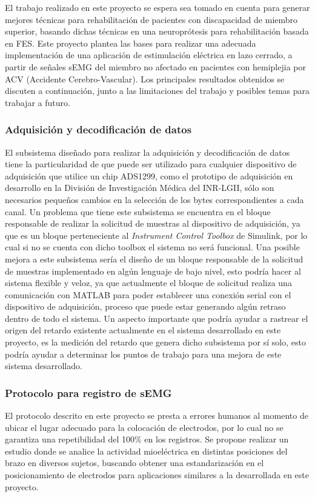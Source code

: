 El trabajo realizado en este proyecto se espera sea tomado en cuenta para generar mejores técnicas para rehabilitación de pacientes con discapacidad de miembro superior, basando dichas técnicas en una neuroprótesis para rehabilitación basada en FES. Este proyecto plantea las bases para realizar una adecuada implementación de una aplicación de estimulación eléctrica en lazo cerrado, a partir de señales sEMG del miembro no afectado en pacientes con hemiplejia por ACV (Accidente Cerebro-Vascular). Los principales resultados obtenidos se discuten a continuación, junto a las limitaciones del trabajo y posibles temas para trabajar a futuro.

\subsubsection*{Adquisición y decodificación de datos}
El subsistema diseñado para realizar la adquisición y decodificación de datos tiene la particularidad de que puede ser utilizado para cualquier dispositivo de adquisición que utilice un chip ADS1299, como el prototipo de adquisición en desarrollo en la División de Investigación Médica del INR-LGII, sólo son necesarios pequeños cambios en la selección de los bytes correspondientes a cada canal. Un problema que tiene este subsistema se encuentra en el bloque responsable de realizar la solicitud de muestras al dispositivo de adquisición, ya que es un bloque perteneciente al \emph{Instrument Control Toolbox} de Simulink\textregistered, por lo cual si no se cuenta con dicho toolbox el sistema no será funcional. Una posible mejora a este subsistema sería el diseño de un bloque responsable de la solicitud de muestras implementado en algún lenguaje de bajo nivel, esto podría hacer al sistema flexible y veloz, ya que actualmente el bloque de solicitud realiza una comunicación con MATLAB\textregistered \; para poder establecer una conexión serial con el dispositivo de adquisición, proceso que puede estar generando algún retraso dentro de todo el sistema. Un aspecto importante que podría ayudar a rastrear el origen del retardo existente actualmente en el sistema desarrollado en este proyecto, es la medición del retardo que genera dicho subsistema por sí solo, esto podría ayudar a determinar los puntos de trabajo para una mejora de este sistema desarrollado.

\subsubsection*{Protocolo para registro de sEMG}
El protocolo descrito en este proyecto se presta a errores humanos al momento de ubicar el lugar adecuado para la colocación de electrodos, por lo cual no se garantiza una repetibilidad del 100$\%$ en los registros. Se propone realizar un estudio donde se analice la actividad mioeléctrica en distintas posiciones del brazo en diversos sujetos, buscando obtener una estandarización en el posicionamiento de electrodos para aplicaciones similares a la desarrollada en este proyecto.

